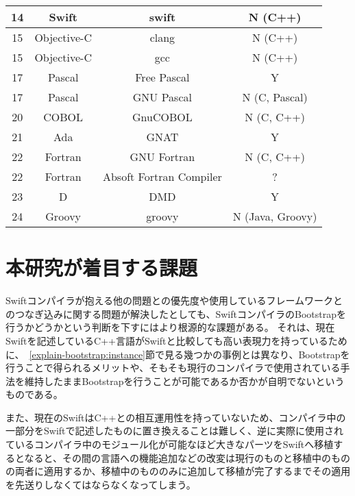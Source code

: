 \begin{table}[tb]
\begin{center}
\begin{tabular}{|c|c|c|c|}
            \hline
            14 & Swift & swift & N (C++) \\
            \hline
            15 & Objective-C & clang & N (C++) \\
            \hline
            15 & Objective-C & gcc & N (C++) \\
            \hline
            17 & Pascal & Free Pascal & Y \\
            \hline
            17 & Pascal & GNU Pascal & N (C, Pascal) \\
            \hline
            20 & COBOL & GnuCOBOL & N (C, C++) \\
            \hline
            21 & Ada & GNAT & Y \\
            \hline
            22 & Fortran & GNU Fortran & N (C, C++) \\
            \hline
            22 & Fortran & Absoft Fortran Compiler & ? \\
            \hline
            23 & D & DMD & Y \\
            \hline
            24 & Groovy & groovy & N (Java, Groovy) \\
            \hline
        \end{tabular}
        \label{table:bootstrapping-languages}
    \end{center}
\end{table}


\section{本研究が着目する課題}
\label{introduction:issue}

Swiftコンパイラが抱える他の問題との優先度や使用しているフレームワークとのつなぎ込みに関する問題が解決したとしても、SwiftコンパイラのBootstrapを行うかどうかという判断を下すにはより根源的な課題がある。
それは、現在Swiftを記述しているC++言語がSwiftと比較しても高い表現力を持っているために、~\ref{explain-bootstrap:instance}節で見る幾つかの事例とは異なり、Bootstrapを行うことで得られるメリットや、そもそも現行のコンパイラで使用されている手法を維持したままBootstrapを行うことが可能であるか否かが自明でないというものである。

また、現在のSwiftはC++との相互運用性を持っていないため、コンパイラ中の一部分をSwiftで記述したものに置き換えることは難しく、逆に実際に使用されているコンパイラ中のモジュール化が可能なほど大きなパーツをSwiftへ移植するとなると、その間の言語への機能追加などの改変は現行のものと移植中のものの両者に適用するか、移植中のもののみに追加して移植が完了するまでその適用を先送りしなくてはならなくなってしまう。


